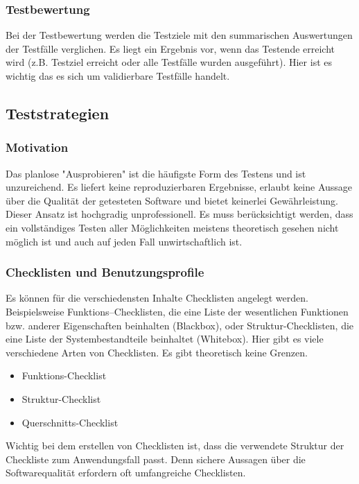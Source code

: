 \subsubsection{Testbewertung}
Bei der Testbewertung werden die Testziele mit den summarischen Auswertungen der Testfälle verglichen. Es liegt ein Ergebnis vor, wenn das Testende erreicht wird (z.B. Testziel erreicht oder alle Testfälle wurden ausgeführt). Hier ist es wichtig das es sich um validierbare Testfälle handelt. 

\subsection{Teststrategien}
\subsubsection{Motivation}
Das planlose "Ausprobieren" ist die häufigste Form des Testens und ist unzureichend. Es liefert keine reproduzierbaren Ergebnisse, erlaubt keine Aussage über die Qualität der getesteten Software und bietet keinerlei Gewährleistung. Dieser Ansatz ist hochgradig unprofessionell. 
\linebreak
Es muss berücksichtigt werden, dass ein vollständiges Testen aller Möglichkeiten meistens theoretisch gesehen nicht möglich ist und auch auf jeden Fall unwirtschaftlich ist.

\subsubsection{Checklisten und Benutzungsprofile}
Es können für die verschiedensten Inhalte Checklisten angelegt werden. Beispielsweise Funktions--Checklisten, die eine Liste der wesentlichen Funktionen bzw. anderer Eigenschaften beinhalten (Blackbox), oder Struktur-Checklisten, die eine Liste der Systembestandteile beinhaltet (Whitebox). Hier gibt es viele verschiedene Arten von  Checklisten. Es gibt theoretisch keine Grenzen.

\begin{itemize}
\item Funktions-Checklist
\item Struktur-Checklist
\item Querschnitts-Checklist
\end{itemize}

Wichtig bei dem erstellen von Checklisten ist, dass die verwendete Struktur der Checkliste zum Anwendungsfall passt. Denn sichere Aussagen über die Softwarequalität erfordern oft umfangreiche Checklisten.

